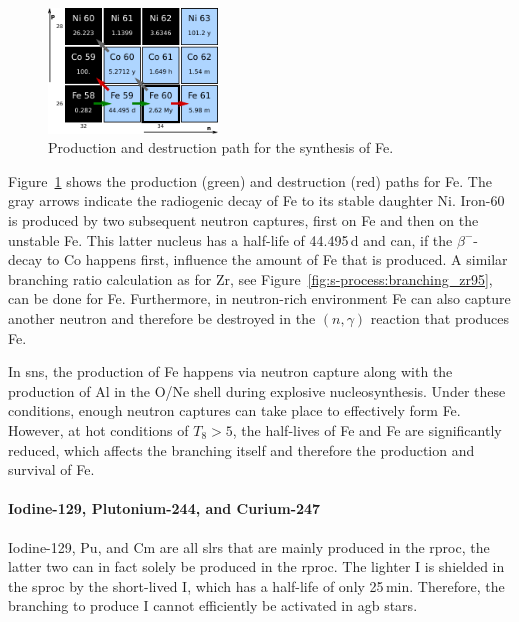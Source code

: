 \begin{figure}[tb]
    \centering
    \includegraphics[width=0.4\textwidth]{graphics/solar_system_slrs/fe60_chartnuc}
    \caption{Production and destruction path for the synthesis of Fe.}
    \label{fig:solar_system_slrs:fe60_production_destruction}
\end{figure}
Figure~\ref{fig:solar_system_slrs:fe60_production_destruction} shows the production (green) and destruction (red) paths for Fe. The gray arrows indicate the radiogenic decay of Fe to its stable daughter Ni. Iron-60 is produced by two subsequent neutron captures, first on Fe and then on the unstable Fe. This latter nucleus has a half-life of 44.495\,d and can, if the $\beta^{-}$-decay to Co happens first, influence the amount of Fe that is produced. A similar branching ratio calculation as for Zr, see Figure~\ref{fig:s-process:branching_zr95}, can be done for Fe. Furthermore, in neutron-rich environment Fe can also capture another neutron and therefore be destroyed in the $(n,\gamma)$ reaction that produces Fe.

In \acp{sn}, the production of Fe happens via neutron capture along with the production of Al in the O/Ne shell during explosive nucleosynthesis. Under these conditions, enough neutron captures can take place to effectively form Fe. However, at hot conditions of $T_8 > 5$, the half-lives of Fe and Fe are significantly reduced, which affects the branching itself and therefore the production and survival of Fe.

\paragraph{Iodine-129, Plutonium-244, and Curium-247}

Iodine-129, Pu, and Cm are all \acp{slr} that are mainly produced in the \ac{rproc}, the latter two can in fact solely be produced in the \ac{rproc}. The lighter I is shielded in the \ac{sproc} by the short-lived I, which has a half-life of only 25\,min. Therefore, the branching to produce I cannot efficiently be activated in \ac{agb} stars.

